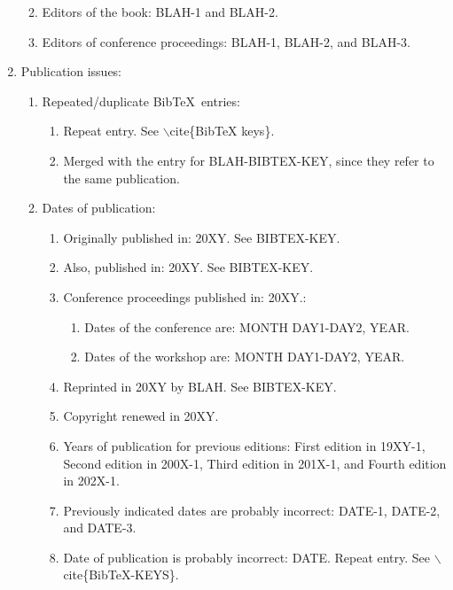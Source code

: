 \documentclass[letter,12pt]{article}
\begin{document}
\begin{enumerate}
\begin{enumerate}
\begin{enumerate}
		\end{enumerate}
	\item Editors of the book: BLAH-1 and BLAH-2.
	\item Editors of conference proceedings: BLAH-1, BLAH-2, and BLAH-3.
	\end{enumerate}
\item Publication issues: \vspace{-0.3cm}
	\begin{enumerate} \itemsep -2pt
	\item Repeated/duplicate {\sc Bib}\TeX\ entries: \vspace{-0.2cm}
		\begin{enumerate} \itemsep -2pt
		\item Repeat entry. See $\backslash$cite\{BibTeX keys\}.
		\item Merged with the entry for BLAH-BIBTEX-KEY, since they refer to the same publication.
		\end{enumerate}
	\item Dates of publication: \vspace{-0.2cm}
		\begin{enumerate} \itemsep -2pt
		\item Originally published in: 20XY. See BIBTEX-KEY.
		\item Also, published in: 20XY. See BIBTEX-KEY.
		\item Conference proceedings published in: 20XY.: \vspace{-0.1cm}
			\begin{enumerate} \itemsep -1pt
			\item Dates of the conference are: MONTH DAY1-DAY2, YEAR.
			\item Dates of the workshop are: MONTH DAY1-DAY2, YEAR.
			\end{enumerate}
		\item Reprinted in 20XY by BLAH. See BIBTEX-KEY.
		\item Copyright renewed in 20XY.
		\item Years of publication for previous editions: First edition in 19XY-1, Second edition in 200X-1, Third edition in 201X-1, and Fourth edition in 202X-1.
		\item Previously indicated dates are probably incorrect: DATE-1, DATE-2, and DATE-3.
		\item Date of publication is probably incorrect: DATE. Repeat entry. See $\backslash$cite\{BibTeX-KEYS\}.

\end{enumerate}
\end{enumerate}
\end{enumerate}
\end{document}
